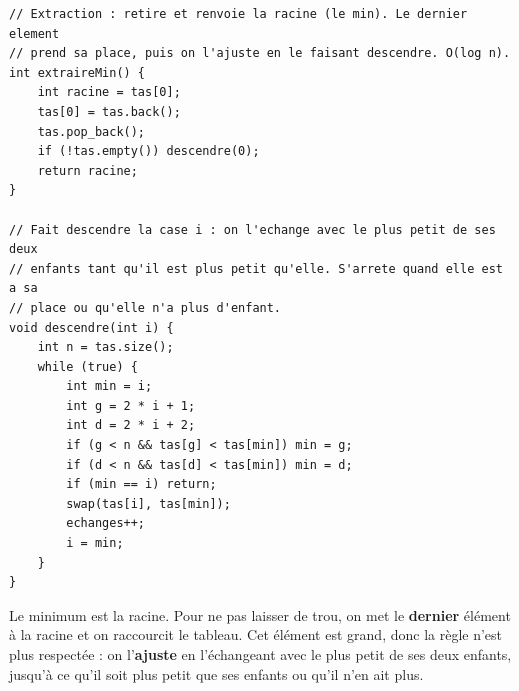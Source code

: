 \documentclass[11pt,a4paper]{article}
\begin{document}
\begin{lstlisting}[caption={Extraction du minimum (\texttt{extraireMin} et \texttt{descendre}).}]
// Extraction : retire et renvoie la racine (le min). Le dernier element
// prend sa place, puis on l'ajuste en le faisant descendre. O(log n).
int extraireMin() {
    int racine = tas[0];
    tas[0] = tas.back();
    tas.pop_back();
    if (!tas.empty()) descendre(0);
    return racine;
}

// Fait descendre la case i : on l'echange avec le plus petit de ses deux
// enfants tant qu'il est plus petit qu'elle. S'arrete quand elle est a sa
// place ou qu'elle n'a plus d'enfant.
void descendre(int i) {
    int n = tas.size();
    while (true) {
        int min = i;
        int g = 2 * i + 1;
        int d = 2 * i + 2;
        if (g < n && tas[g] < tas[min]) min = g;
        if (d < n && tas[d] < tas[min]) min = d;
        if (min == i) return;
        swap(tas[i], tas[min]);
        echanges++;
        i = min;
    }
}
\end{lstlisting}

Le minimum est la racine. Pour ne pas laisser de trou, on met le \textbf{dernier} élément
à la racine et on raccourcit le tableau. Cet élément est grand, donc la règle n'est plus
respectée : on l'\textbf{ajuste} en l'échangeant avec le plus petit de ses deux enfants,
jusqu'à ce qu'il soit plus petit que ses enfants ou qu'il n'en ait plus.
\end{document}
